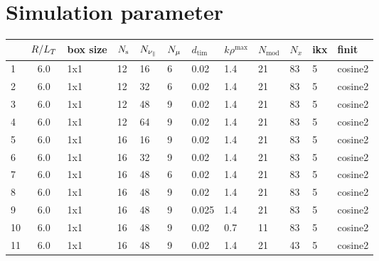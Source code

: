 \section{Simulation parameter}
\label{append:data}

\begin{center}
    \captionsetup{type=table}
    \begin{tabular}{l | c | l | l l l l l l l l | l}
            & $R/L_T$ & box size  & $N_\mathrm{s}$ & $N_{\nu_\parallel}$ & $N_\mu$ & $d_\mathrm{tim}$ & $k\rho^\mathrm{max}$ & $N_\mathrm{mod}$ & $N_x$ & ikx & finit   \\ \hline 
        1   & 6.0    & 1x1       & 12    & 16       & 6      & 0.02             & 1.4                  & 21               & 83    & 5   & cosine2 \\ 
        2   & 6.0    & 1x1       & 12    & 32       & 6      & 0.02             & 1.4                  & 21               & 83    & 5   & cosine2 \\ 
        3   & 6.0    & 1x1       & 12    & 48       & 9      & 0.02             & 1.4                  & 21               & 83    & 5   & cosine2 \\ 
        4   & 6.0    & 1x1       & 12    & 64       & 9      & 0.02             & 1.4                  & 21               & 83    & 5   & cosine2 \\ 
        5   & 6.0    & 1x1       & 16    & 16       & 9      & 0.02             & 1.4                  & 21               & 83    & 5   & cosine2 \\ 
        6   & 6.0    & 1x1       & 16    & 32       & 9      & 0.02             & 1.4                  & 21               & 83    & 5   & cosine2 \\ 
        7   & 6.0    & 1x1       & 16    & 48       & 6      & 0.02             & 1.4                  & 21               & 83    & 5   & cosine2 \\ 
        8   & 6.0    & 1x1       & 16    & 48       & 9      & 0.02             & 1.4                  & 21               & 83    & 5   & cosine2 \\ 
        9   & 6.0    & 1x1       & 16    & 48       & 9      & 0.025            & 1.4                  & 21               & 83    & 5   & cosine2 \\ 
        10  & 6.0    & 1x1       & 16    & 48       & 9      & 0.02             & 0.7                  & 11               & 83    & 5   & cosine2 \\ 
        11  & 6.0    & 1x1       & 16    & 48       & 9      & 0.02             & 1.4                  & 21               & 43    & 5   & cosine2 \\ 

\end{tabular}
\end{center}
